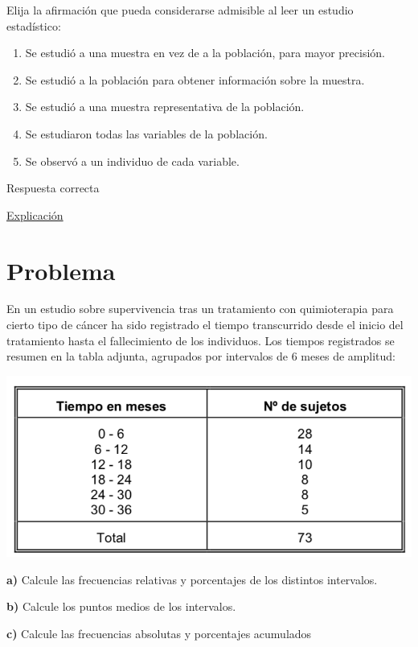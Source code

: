 \documentclass[
]{book}
\providecommand{\tightlist}{%
  \setlength{\itemsep}{0pt}\setlength{\parskip}{0pt}}
\begin{document}
Elija la afirmación que pueda considerarse admisible al leer un estudio estadístico:

\begin{enumerate}
\def\labelenumi{\alph{enumi})}
\tightlist
\item
  Se estudió a una muestra en vez de a la población, para mayor precisión.
\item
  Se estudió a la población para obtener información sobre la muestra.
\item
  Se estudió a una muestra representativa de la población.
\item
  Se estudiaron todas las variables de la población.
\item
  Se observó a un individuo de cada variable.
\end{enumerate}

Respuesta correcta

\href{https://1fjmanzano.github.io/bioestadistica/me\%CC\%81todos-de-muestreo.html}{Explicación}

\hypertarget{problema-3}{%
\section{Problema}\label{problema-3}}

En un estudio sobre supervivencia tras un tratamiento con quimioterapia para cierto tipo de cáncer ha sido registrado el tiempo transcurrido desde el inicio del tratamiento hasta el fallecimiento de los individuos. Los tiempos registrados se resumen en la tabla adjunta, agrupados por intervalos de 6 meses de amplitud:

\includegraphics[width=10.44in]{img/1_1}

\textbf{a)} Calcule las frecuencias relativas y porcentajes de los distintos intervalos.

\textbf{b)} Calcule los puntos medios de los intervalos.

\textbf{c)} Calcule las frecuencias absolutas y porcentajes acumulados
\end{document}

